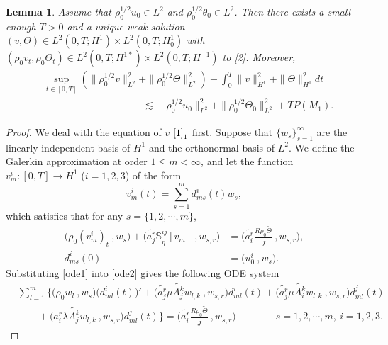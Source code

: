 \documentclass[12pt,a4paper]{amsart}
\numberwithin{equation}{section}
\theoremstyle{plain}
\newtheorem{Lem}[Thm]{Lemma}
\theoremstyle{definition}
\begin{document}
\begin{Lem}
	Assume that $\rho_0^{1/2} u_0\in L^2$ and  $\rho_0^{1/2} \theta_0\in L^2$. 
	Then there exists a small enough $T>0$ and a unique weak solution $(v,\Theta) \in L^2(0,T; H^1)\times L^2(0,T;H^1_0)$ with $(\rho_0v_t,\rho_0\Theta_t)\in L^2(0,T; H^{1*})\times L^2(0,T;H^{-1})$ to \eqref{2}.
	Moreover, 
	\begin{align*}
	&	\sup\limits_{t\in[0,T]} (\|\rho_0^{1/2} v\|_{L^2}^2+\|\rho_0^{1/2} \Theta\|_{L^2}^2) +\int_{0}^{T}\|v\|_{H^1}^2+\|\Theta\|_{H^1}^2 dt 
	\\
	&\qquad\qquad\qquad\qquad\qquad\lesssim \|\rho_0^{1/2} u_0\|_{L^2}^2+\|\rho_0^{1/2} \Theta_0\|_{L^2}^2+TP(M_1).
	\end{align*}
\end{Lem}
\begin{proof}
	We deal with the equation of $v$ $\eqref{1}_1$ first.
	Suppose that $\{w_s\}_{s=1}^{\infty}$ are the linearly independent basis of $H^1$ and the orthonormal basis of $L^2$.
	We define the Galerkin approximation at order $1\leq m<\infty$, and let the function $v^i_m:[0,T]\rightarrow H^1$ ($i=1,2,3$) of the form
	\begin{equation}
	\label{ode1}
	v^i_m(t)=\sum\limits_{s=1}^{m} d^i_{ms}(t)w_s,
	\end{equation}
	which satisfies that for any $s=\{1,2,\cdots,m\}$,
	\begin{align}
	\Big(\rho_0 (v^i_m)_t~, w_s \Big) 
	+ \Big(\widetilde{a^r_j}\mathbb{S}^{ij}_{\widetilde{\eta}}[v_m]~, w_{s,r} \Big)
	&=\Big(\widetilde{a^r_i} \frac{R\rho_0 \widetilde{\Theta}}{\widetilde{J}}~, w_{s,r} \Big),
	\label{ode2}\\
	d^i_{ms}(0)&=\Big(u^i_0~, w_s\Big) \label{ode3}.
	\end{align}
	Substituting \eqref{ode1} into \eqref{ode2} gives the following ODE system
	\begin{equation}
	\label{ode4}
	\begin{aligned}
	&\sum\limits_{l=1}^{m}\Big\{ 
	\Big(\rho_0 w_l~, w_s \Big) \big(d^i_{ml}(t)\big)'
	+ \Big(\widetilde{a^r_j} \mu \widetilde{A^k_j} w_{l,k}~, w_{s,r} \Big) d^i_{ml}(t)
	+ \Big(\widetilde{a^r_j} \mu \widetilde{A^k_i} w_{l,k}~, w_{s,r} \Big) d^j_{ml}(t)\\
	& \qquad
	+ \Big(\widetilde{a^r_i} \lambda \widetilde{A^k_j} w_{l,k}~, w_{s,r} \Big) d^j_{ml}(t) \Big\}
	=\Big(\widetilde{a^r_i} \frac{R\rho_0 \widetilde{\Theta}}{\widetilde{J}}~, w_{s,r} \Big) \qquad\qquad s=1,2,\cdots,m,~i=1,2,3.
	\end{aligned}

\end{equation}
\end{proof}
\end{document}
